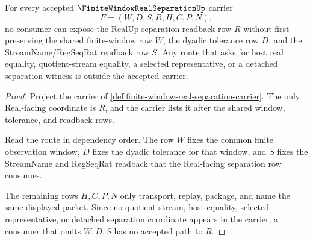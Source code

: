 \begin{theorem}
\label{thm:finite-window-real-separation-window-refusal}
For every accepted $\FiniteWindowRealSeparationUp$ carrier
$$
F=(W,D,S,R,H,C,P,N),
$$
no consumer can expose the RealUp separation readback row $R$ without first preserving the shared finite-window row $W$, the dyadic tolerance row $D$, and the StreamName/RegSeqRat readback row $S$. Any route that asks for host real equality, quotient-stream equality, a selected representative, or a detached separation witness is outside the accepted carrier.
\end{theorem}
\begin{proof}
Project the carrier of \autoref{def:finite-window-real-separation-carrier}. The only Real-facing coordinate is $R$, and the carrier lists it after the shared window, tolerance, and readback rows.

Read the route in dependency order. The row $W$ fixes the common finite observation window, $D$ fixes the dyadic tolerance for that window, and $S$ fixes the StreamName and RegSeqRat readback that the Real-facing separation row consumes.

The remaining rows $H,C,P,N$ only transport, replay, package, and name the same displayed packet. Since no quotient stream, host equality, selected representative, or detached separation coordinate appears in the carrier, a consumer that omits $W,D,S$ has no accepted path to $R$.
\end{proof}


